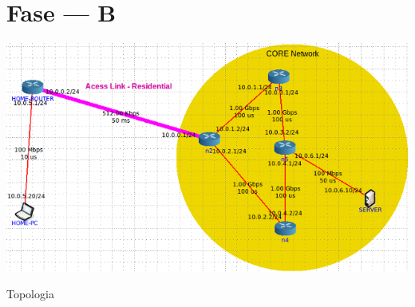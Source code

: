 \section{Fase --- B}

\begin{center}
 	
 	\includegraphics[width=\textwidth,height=\textheight,keepaspectratio]{resources/images/Alinea1/topologia.png}
 	\captionsetup{type=figure, width=0.8\linewidth}
	\caption{Topologia}
\label{fig:ssec1:topologia} 
\end{center}






